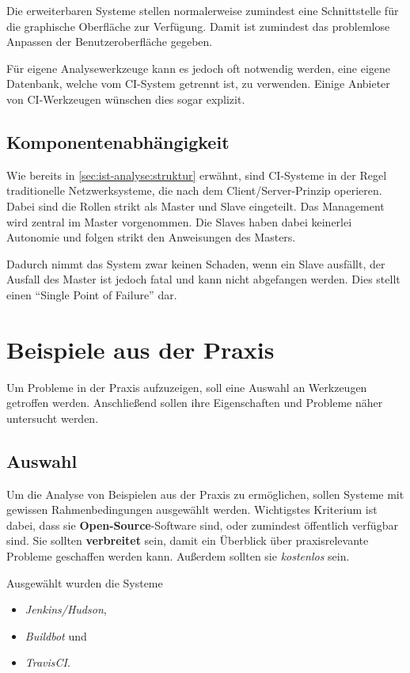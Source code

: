 Die erweiterbaren Systeme stellen normalerweise zumindest eine Schnittstelle
für die graphische Oberfläche zur Verfügung.
Damit ist zumindest das problemlose Anpassen der Benutzeroberfläche gegeben.


Für eigene Analysewerkzeuge kann es jedoch oft notwendig werden,
eine eigene Datenbank, welche vom \ac{CI}-System getrennt ist, zu verwenden.
Einige Anbieter von \ac{CI}-Werkzeugen wünschen dies sogar explizit.


\subsection{Komponentenabhängigkeit}

Wie bereits in \cref{sec:ist-analyse:struktur} erw\"ahnt,
sind \ac{CI}-Systeme in der Regel traditionelle Netzwerksysteme,
die nach dem Client/Server-Prinzip operieren.
Dabei sind die Rollen strikt als Master und Slave eingeteilt.
Das Management wird zentral im Master vorgenommen.
Die Slaves haben dabei keinerlei Autonomie
und folgen strikt den Anweisungen des Masters.

Dadurch nimmt das System zwar keinen Schaden, wenn ein Slave ausfällt,
der Ausfall des Master ist jedoch fatal und kann nicht abgefangen werden.
Dies stellt einen ``Single Point of Failure'' dar.


\section{Beispiele aus der Praxis}

Um Probleme in der Praxis aufzuzeigen,
soll eine Auswahl an Werkzeugen getroffen werden.
Anschließend sollen ihre Eigenschaften und Probleme
näher untersucht werden.


\subsection{Auswahl}

Um die Analyse von Beispielen aus der Praxis zu ermöglichen,
sollen Systeme mit gewissen Rahmenbedingungen ausgew\"ahlt werden.
Wichtigstes Kriterium ist dabei, dass sie \textbf{Open-Source}-Software sind,
oder zumindest öffentlich verfügbar sind.
Sie sollten \textbf{verbreitet} sein, damit ein Überblick
über praxisrelevante Probleme geschaffen werden kann.
Außerdem sollten sie \textit{kostenlos} sein. %

Ausgewählt wurden die Systeme
\begin{itemize}
  \item \emph{Jenkins/Hudson},
  \item \emph{Buildbot} und
  \item \emph{TravisCI}.
\end{itemize}

